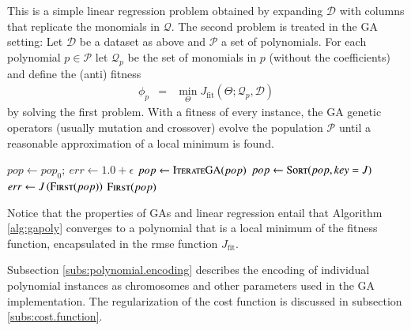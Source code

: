 \documentclass[preprint,authoryear,12pt]{elsarticle}
\begin{document}
%
This is a simple linear regression problem obtained by expanding $\mathcal{D}$ with columns that replicate the monomials in $\mathcal{Q}$. The second problem is treated in the \ac{GA} setting: Let $\mathcal{D}$ be a dataset as above and $\mathcal{P}$ a set of polynomials. For each polynomial $p\in \mathcal{P}$ let $\mathcal{Q}_p$ be the set of monomials in $p$ (without the coefficients) and define the (anti) fitness
%
\begin{eqnarray*}
\phi_p &=& \min_\Theta J_{\textrm{fit}}\left(\Theta;\mathcal{Q}_p,\mathcal{D}\right)
\end{eqnarray*}
%
by solving the first problem. With a fitness of every instance, the \ac{GA} genetic operators (usually mutation and crossover) evolve the population $\mathcal{P}$ until a reasonable approximation of a local minimum is found. 
%
\begin{algorithm}[t]
\begin{algorithmic}
	\State $pop \gets pop_0;\: err \gets 1.0+\epsilon$
		\State $pop \gets \Call{IterateGA}{pop}$
		\State $pop \gets \Call{Sort}{pop, key = J}$
		\State $err \gets J\left(\Call{First}{pop}\right)$
	\EndWhile
	\State\Return $\Call{First}{pop}$
\EndFunction
\end{algorithmic}
\caption{This \ac{EPR} algorithm uses linear regression in the calculation of the \ac{rmse} $J$ and the space of polynomials is searched by the \acp{GA} iteration step. At exit the \ac{rmse} of the fittest instance is bounded by $\epsilon$ or the maximum number of allowed iterations.}\label{alg:gapoly}
\end{algorithm} 
%
Notice that the properties of \acp{GA} and linear regression entail that Algorithm \ref{alg:gapoly} converges to a polynomial that is a local minimum of the fitness function, encapsulated in the \ac{rmse} function $J_{\textrm{fit}}$.
%

%
Subsection \ref{subs:polynomial.encoding} describes the encoding of individual polynomial instances as chromosomes and other parameters used in the \ac{GA} implementation. The regularization of the cost function is discussed in subsection \ref{subs:cost.function}.

%
\end{document}
